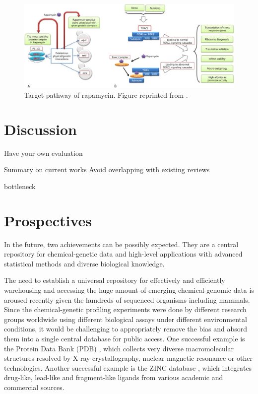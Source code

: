 \documentclass[12pt,conference,compsocconf]{../IEEEtran}
\begin{document}
\begin{figure}
\centering
\includegraphics[width=\linewidth]{1079-5.png}
\caption{Target pathway of rapamycin. Figure reprinted from \citep{1079}.}
\label{fig:1079-5}
\end{figure}

\section{Discussion}

Have your own evaluation

Summary on current works
  Avoid overlapping with existing reviews
  
\citep{1080}

bottleneck

\section{Prospectives}

In the future, two achievements can be possibly expected. They are a central repository for chemical-genetic data and high-level applications with advanced statistical methods and diverse biological knowledge.

The need to establish a universal repository for effectively and efficiently warehousing and accessing the huge amount of emerging chemical-genomic data is aroused recently given the hundreds of sequenced organisms including mammals. Since the chemical-genetic profiling experiments were done by different research groups worldwide using different biological assays under different environmental conditions, it would be challenging to appropriately remove the bias and absord them into a single central database for public access. One successful example is the Protein Data Bank (PDB) \citep{105}, which collects very diverse macromolecular structures resolved by X-ray crystallography, nuclear magnetic resonance or other technologies. Another successful example is the ZINC database \citep{532}, which integrates drug-like, lead-like and fragment-like ligands from various academic and commercial sources.
\end{document}
